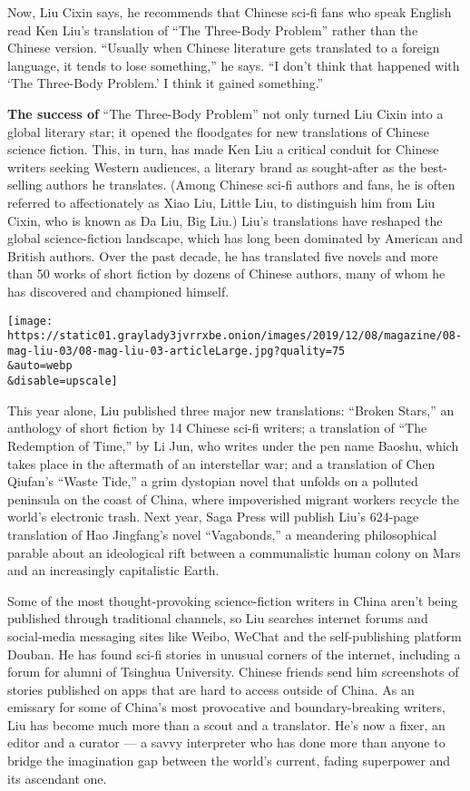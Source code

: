 Now, Liu Cixin says, he recommends that Chinese sci-fi fans who speak
English read Ken Liu's translation of ``The Three-Body Problem'' rather
than the Chinese version. ``Usually when Chinese literature gets
translated to a foreign language, it tends to lose something,'' he says.
``I don't think that happened with `The Three-Body Problem.' I think it
gained something.''

\textbf{The success of} ``The Three-Body Problem'' not only turned Liu
Cixin into a global literary star; it opened the floodgates for new
translations of Chinese science fiction. This, in turn, has made Ken Liu
a critical conduit for Chinese writers seeking Western audiences, a
literary brand as sought-after as the best-selling authors he
translates. (Among Chinese sci-fi authors and fans, he is often referred
to affectionately as Xiao Liu, Little Liu, to distinguish him from Liu
Cixin, who is known as Da Liu, Big Liu.) Liu's translations have
reshaped the global science-fiction landscape, which has long been
dominated by American and British authors. Over the past decade, he has
translated five novels and more than 50 works of short fiction by dozens
of Chinese authors, many of whom he has discovered and championed
himself.

\texttt{[image: https://static01.graylady3jvrrxbe.onion/images/2019/12/08/magazine/08-mag-liu-03/08-mag-liu-03-articleLarge.jpg?quality=75\\\&auto=webp\\\&disable=upscale]}

This year alone, Liu published three major new translations: ``Broken
Stars,'' an anthology of short fiction by 14 Chinese sci-fi writers; a
translation of ``The Redemption of Time,'' by Li Jun, who writes under
the pen name Baoshu, which takes place in the aftermath of an
interstellar war; and a translation of Chen Qiufan's ``Waste Tide,'' a
grim dystopian novel that unfolds on a polluted peninsula on the coast
of China, where impoverished migrant workers recycle the world's
electronic trash. Next year, Saga Press will publish Liu's 624-page
translation of Hao Jingfang's novel ``Vagabonds,'' a meandering
philosophical parable about an ideological rift between a communalistic
human colony on Mars and an increasingly capitalistic Earth.

Some of the most thought-provoking science-fiction writers in China
aren't being published through traditional channels, so Liu searches
internet forums and social-media messaging sites like Weibo, WeChat and
the self-publishing platform Douban. He has found sci-fi stories in
unusual corners of the internet, including a forum for alumni of
Tsinghua University. Chinese friends send him screenshots of stories
published on apps that are hard to access outside of China. As an
emissary for some of China's most provocative and boundary-breaking
writers, Liu has become much more than a scout and a translator. He's
now a fixer, an editor and a curator --- a savvy interpreter who has
done more than anyone to bridge the imagination gap between the world's
current, fading superpower and its ascendant one.

